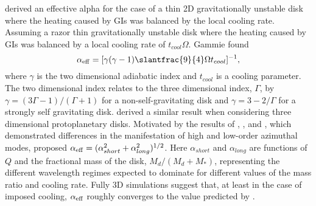 \documentclass[manuscript]{aastex}
\begin{document}
\citet{gammie2001} derived an effective alpha for the case of a thin 2D gravitationally unstable disk where the heating caused by GIs was balanced by the local cooling rate.  
Assuming a razor thin gravitationally unstable disk where the heating caused by
GIs was balanced by a local cooling rate of $t_{cool}\Omega$.
Gammie found
\begin{equation}
\alpha_{\rm{eff}} = [\gamma(\gamma - 1) \slantfrac{9}{4}\Omega t_{cool}]^{-1},
\label{eq:gammie}
\end{equation}
where $\gamma$ is the two dimensional adiabatic index and $t_{cool}$ is a cooling parameter. 
The two dimensional index relates
to the three dimensional index, $\Gamma$, by 
$\gamma = (3\Gamma - 1) / (\Gamma + 1)$
for a non-self-gravitating
disk and
$\gamma = 3 - 2/\Gamma $
for a strongly self gravitating disk.   \cite{lodato2004} derived a similar result when considering three dimensional protoplanetary disks.
Motivated by
the results of \cite{laughlin1996}, \cite{gammie2001}, and \cite{lodato2004, lodato2005}, which demonstrated differences in the manifestation of high and low-order azimuthal modes, \citet{kratter2008} 
proposed $\alpha_{\rm{eff}} = (\alpha_{short}^2 + \alpha_{long}^2)^{1/2}$. Here $\alpha_{short}$ and $\alpha_{long}$
are functions of $Q$ and the fractional mass of the disk, $M_d/\left( M_d+M_*\right)$, representing 
the different wavelength regimes expected to dominate for different values of the mass ratio and cooling rate. 
Fully 3D simulations \citep[e.g.][]{lodato2004, cossins2009} suggest that, at least in the case of imposed cooling, $\alpha_{\rm{\rm{eff}}}$ roughly converges to the value predicted by \citeauthor{gammie2001}. 
\end{document}

